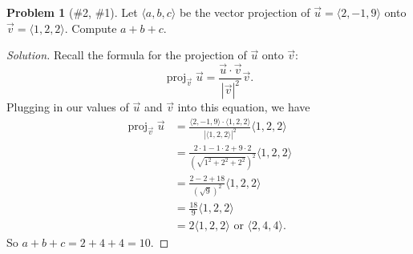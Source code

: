 \documentclass{article}
\theoremstyle{plain}
\theoremstyle{definition}
\newtheorem{problem}[exercise]{Problem}
\theoremstyle{remark}
\DeclareMathOperator{\proj}{proj}
\begin{document}
\begin{problem}[{\color{Green}\#2}, {\color{Red}\#1}]
Let $\langle a,b,c\rangle$ be the vector projection of $\vec u=\langle
2,-1,9\rangle$ onto $\vec v=\langle 1,2,2\rangle$. Compute $a+b+c$.
\end{problem}
\begin{proof}[Solution]
Recall the formula for the projection of $\vec u$ onto $\vec v$:
\begin{equation}
  \label{eq:projection-onto}
\proj_{\vec v}\vec u=\frac{\vec u\cdot \vec v}{\left|\vec v\right|^2}\vec v.
\end{equation}
Plugging in our values of $\vec u$ and $\vec v$ into this equation, we have
\begingroup
\allowdisplaybreaks
\begin{align*}
\proj_{\vec v}\vec u
&=\frac{\langle 2,-1,9\rangle\cdot\langle 1,2,2\rangle}
  {\left|\langle 1,2,2\rangle\right|^2}\langle 1,2,2\rangle\\
&=\frac{2\cdot 1-1\cdot2+9\cdot 2}
{\left(\sqrt{1^2+2^2+2^2}\right)^2}\langle 1,2,2\rangle\\
&=\frac{2-2+18}{\left(\sqrt{9}\right)^2}\langle 1,2,2\rangle\\
&=\frac{18}{9}\langle 1,2,2\rangle\\
&=\text{$2\langle 1,2,2\rangle$ or $\langle 2,4,4\rangle$.}
\end{align*}
\endgroup
So $\boxed{a+b+c=2+4+4=10}$.
\end{proof}
\end{document}
